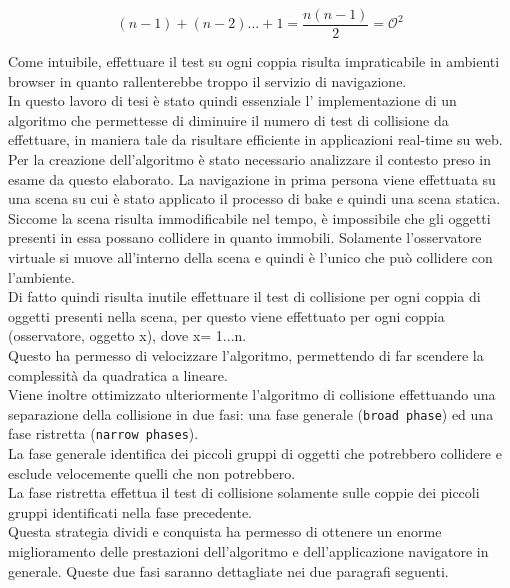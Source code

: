 \begin{equation}
(n - 1) + (n - 2) ... + 1 = \frac{n(n - 1)}{2} = \mathcal{O}^2
\end{equation}

Come intuibile, effettuare il test su ogni coppia risulta impraticabile in ambienti browser in quanto rallenterebbe troppo il servizio di navigazione. 
\\
In questo lavoro di tesi è stato quindi essenziale l’ implementazione di un algoritmo che permettesse di diminuire il numero di test di collisione da effettuare, in maniera tale da risultare efficiente in applicazioni real-time su web.
\\
Per la creazione dell’algoritmo è stato necessario analizzare il contesto preso in esame da questo elaborato.
La navigazione in prima persona viene effettuata su una scena su cui è stato applicato il processo di bake e quindi una scena statica. Siccome la scena risulta immodificabile nel tempo, è impossibile che gli oggetti presenti in essa possano collidere in quanto immobili.
Solamente l’osservatore virtuale si muove all’interno della scena e quindi è l’unico che può collidere con l’ambiente.
\\
Di fatto quindi risulta inutile effettuare il test di collisione per ogni coppia di oggetti presenti nella scena, per questo viene effettuato per ogni coppia (osservatore, oggetto x), dove x= 1...n.
\\
Questo ha permesso di velocizzare l’algoritmo, permettendo di far scendere la complessità da quadratica a lineare.
\\
Viene inoltre ottimizzato ulteriormente l’algoritmo di collisione effettuando una separazione della collisione in due fasi: una fase generale (\texttt{broad phase}) ed una fase ristretta (\texttt{narrow phases}).
\\
La fase generale identifica dei piccoli gruppi di oggetti che potrebbero collidere e esclude velocemente quelli che non potrebbero.
\\
La fase ristretta effettua il test di collisione solamente sulle coppie dei piccoli gruppi identificati nella fase precedente.
\\
Questa strategia dividi e conquista ha permesso di ottenere un enorme miglioramento delle prestazioni dell’algoritmo e dell’applicazione navigatore in generale. Queste due fasi saranno dettagliate nei due paragrafi seguenti.

